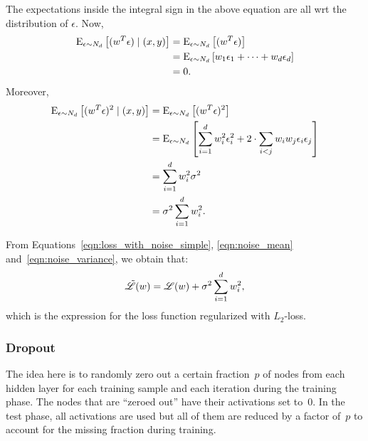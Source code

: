The expectations inside the integral sign in the above equation are all wrt the 
distribution of $\epsilon$. Now, 
\begin{align}
    \label{eqn:noise_mean}
    \text{E}_{\epsilon \sim N_d} \left [ (w^T \epsilon) \mid (x, y) \right ] 
        & = \text{E}_{\epsilon \sim N_d} \left [ (w^T \epsilon) \right ] \nonumber \\
        & = \text{E}_{\epsilon \sim N_d} \left [ w_1 \epsilon_1 + \cdots + w_d \epsilon_d \right ] \nonumber \\
        & = 0.
\end{align}
Moreover, 
\begin{align}
    \label{eqn:noise_variance}
    \text{E}_{\epsilon \sim N_d} \left [ (w^T \epsilon)^2 \mid (x, y) \right ] 
        & = \text{E}_{\epsilon \sim N_d} \left [ (w^T \epsilon)^2 \right ] \nonumber \\
        & = \text{E}_{\epsilon \sim N_d} \left [ \sum_{i = 1}^{d} w_i^2 \epsilon_i^2 + 
                    2 \cdot \sum_{i < j} w_i w_j \epsilon_i \epsilon_j \right ] \nonumber \\
        & = \sum_{i = 1}^{d} w_i^2 \sigma^2 \nonumber \\
        & = \sigma^2 \sum_{i = 1}^{d} w_i^2.
\end{align}

From Equations~\ref{eqn:loss_with_noise_simple}, \ref{eqn:noise_mean} 
and~\ref{eqn:noise_variance}, we obtain that:
\begin{equation}
    \tilde{\mathscr{L}} (w) = \mathscr{L} (w) + \sigma^2 \sum_{i = 1}^{d} w_i^2,
\end{equation}
which is the expression for the loss function regularized with $L_2$-loss.

\subsubsection{Dropout}
The idea here is to randomly zero out a certain fraction~$p$ of nodes from 
each hidden layer for each training sample and each iteration during the 
training phase. The nodes that are ``zeroed out'' have their activations set 
to~$0$. In the test phase, all activations are used but all of them are reduced 
by a factor of~$p$ to account for the missing fraction during training.   

